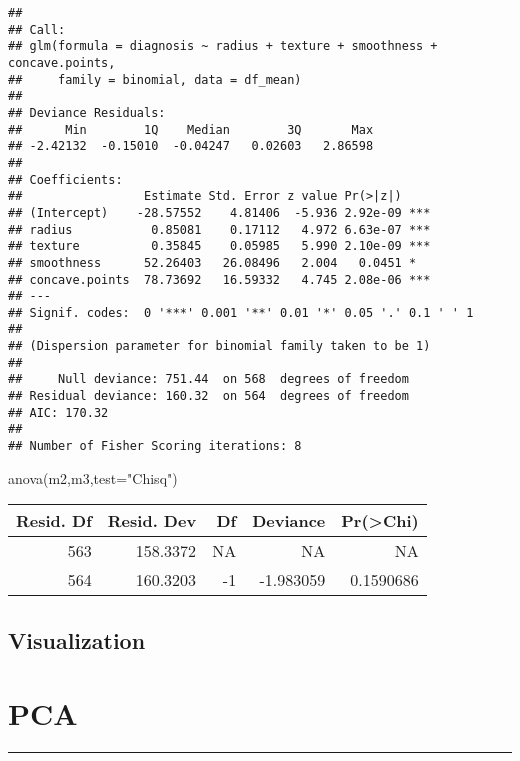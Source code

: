 \documentclass[
  11pt,
]{article}
\newenvironment{Shaded}{\begin{snugshade}}{\end{snugshade}}
\newcommand{\AttributeTok}[1]{\textcolor[rgb]{0.77,0.63,0.00}{#1}}
\newcommand{\FunctionTok}[1]{\textcolor[rgb]{0.00,0.00,0.00}{#1}}
\newcommand{\NormalTok}[1]{#1}
\newcommand{\StringTok}[1]{\textcolor[rgb]{0.31,0.60,0.02}{#1}}
\begin{document}
\begin{verbatim}
## 
## Call:
## glm(formula = diagnosis ~ radius + texture + smoothness + concave.points, 
##     family = binomial, data = df_mean)
## 
## Deviance Residuals: 
##      Min        1Q    Median        3Q       Max  
## -2.42132  -0.15010  -0.04247   0.02603   2.86598  
## 
## Coefficients:
##                 Estimate Std. Error z value Pr(>|z|)    
## (Intercept)    -28.57552    4.81406  -5.936 2.92e-09 ***
## radius           0.85081    0.17112   4.972 6.63e-07 ***
## texture          0.35845    0.05985   5.990 2.10e-09 ***
## smoothness      52.26403   26.08496   2.004   0.0451 *  
## concave.points  78.73692   16.59332   4.745 2.08e-06 ***
## ---
## Signif. codes:  0 '***' 0.001 '**' 0.01 '*' 0.05 '.' 0.1 ' ' 1
## 
## (Dispersion parameter for binomial family taken to be 1)
## 
##     Null deviance: 751.44  on 568  degrees of freedom
## Residual deviance: 160.32  on 564  degrees of freedom
## AIC: 170.32
## 
## Number of Fisher Scoring iterations: 8
\end{verbatim}

\begin{Shaded}
\begin{Highlighting}[]
\FunctionTok{anova}\NormalTok{(m2,m3,}\AttributeTok{test=}\StringTok{"Chisq"}\NormalTok{)}
\end{Highlighting}
\end{Shaded}

\begin{tabular}{r|r|r|r|r}
\hline
Resid. Df & Resid. Dev & Df & Deviance & Pr(>Chi)\\
\hline
563 & 158.3372 & NA & NA & NA\\
\hline
564 & 160.3203 & -1 & -1.983059 & 0.1590686\\
\hline
\end{tabular}

\hypertarget{visualization}{%
\subsection{Visualization}\label{visualization}}

\hypertarget{pca}{%
\section{PCA}\label{pca}}

\begin{center}\rule{0.5\linewidth}{0.5pt}\end{center}
\end{document}
